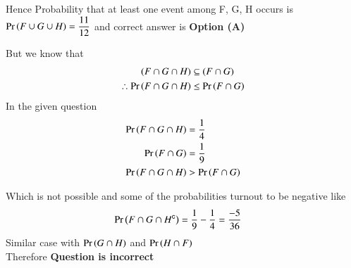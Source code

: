\documentclass[journal,12pt,twocolumn]{IEEEtran}
\begin{document}
Hence Probability that at least one event among F, G, H occurs is $\Pr\left(F \cup G \cup H\right)=\dfrac{11}{12}$ and correct answer is \textbf{Option (A)}
\null \par \null 
But we know that 
\begin{align*}
(F \cap G \cap H) &\subseteq (F \cap G) \\
\therefore \Pr\left(F \cap G \cap H\right) &\leq \Pr\left(F \cap G\right) 
\end{align*}
In the given question 
\begin{align*}
\Pr\left(F \cap G \cap H\right) &= \dfrac{1}{4} \\
\Pr\left(F \cap G\right)        &= \dfrac{1}{9} \\
\Pr\left(F \cap G \cap H\right) &> \Pr\left(F \cap G\right)
\end{align*}

Which is not possible and some of the probabilities turnout to be negative like 
\begin{align*}
\Pr\left(F \cap G \cap H^{\mathsf{c}}\right) &= \dfrac{1}{9} - \dfrac{1}{4} = \dfrac{-5}{36}
\end{align*}
Similar case with $\Pr\left(G \cap H\right)$ and $\Pr\left(H \cap F\right)$ \\
Therefore \textbf{Question is incorrect}
\end{document}
